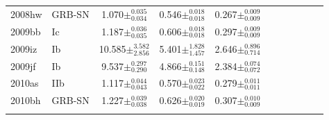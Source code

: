 \documentclass[a4paper,fleqn,usenatbib]{mnras}
\begin{document}
\begin{table}
\begin{minipage}{140mm}
\begin{tabular}{@{}llcccccclcc@{}}
2008hw & GRB-SN & 1.070$ \pm^{0.035}_{0.034}$ &0.546$ \pm^{0.018}_{0.018}$ &0.267$ \pm^{0.009}_{0.009}$ \\
2009bb & Ic & 1.187$ \pm^{0.036}_{0.035}$ &0.606$ \pm^{0.018}_{0.018}$ &0.297$ \pm^{0.009}_{0.009}$ \\
2009iz & Ib & 10.585$ \pm^{3.582}_{2.856}$ &5.401$ \pm^{1.828}_{1.457}$ &2.646$ \pm^{0.896}_{0.714}$ \\
2009jf & Ib & 9.537$ \pm^{0.297}_{0.290}$ &4.866$ \pm^{0.151}_{0.148}$ &2.384$ \pm^{0.074}_{0.072}$ \\
2010as & IIb & 1.117$ \pm^{0.044}_{0.043}$ &0.570$ \pm^{0.023}_{0.022}$ &0.279$ \pm^{0.011}_{0.011}$ \\
2010bh & GRB-SN & 1.227$ \pm^{0.039}_{0.038}$ &0.626$ \pm^{0.020}_{0.019}$ &0.307$ \pm^{0.010}_{0.009}$ \\

\hline

 \label{MoE}
\end{tabular}
\end{minipage}
\end{table}
\end{document}
